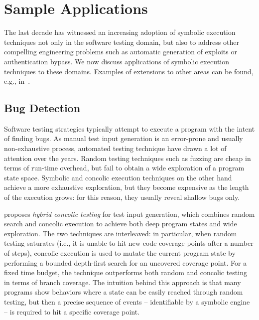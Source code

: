 
\section{Sample Applications}
\label{se:applications}

The last decade has witnessed an increasing adoption of symbolic execution techniques not only in the software testing domain, but also to address other compelling engineering problems such as automatic generation of exploits or authentication bypass. We now discuss  applications of symbolic execution techniques to these domains. Examples of extensions to other areas can be found, e.g., in~\cite{CGK-ICSE11}.

\subsection{Bug Detection}
\label{ss:bug-detection}

Software testing strategies typically attempt to execute a program with the intent of finding bugs. As manual test input generation is an error-prone and usually non-exhaustive process, automated testing technique have drawn a lot of attention over the years. Random testing techniques such as fuzzing are cheap in terms of run-time overhead, but fail to obtain a wide exploration of a program state space. Symbolic and concolic execution techniques on the other hand achieve a more exhaustive exploration, but they become expensive as the length of the execution grows: for this reason, they usually reveal shallow bugs only.

\cite{RK-ICSE07} proposes {\em hybrid concolic testing} for test input generation, which combines random search and concolic execution to achieve both deep program states and wide exploration. The two techniques are interleaved: in particular, when random testing saturates (i.e., it is unable to hit new code coverage points after a number of steps), concolic execution is used to mutate the current program state by performing a bounded depth-first search for an uncovered coverage point. For a fixed time budget, the technique outperforms both random and concolic testing in terms of branch coverage. The intuition behind this approach is that many programs show behaviors where a state can be easily reached through random testing, but then a precise sequence of events -- identifiable by a symbolic engine -- is required to hit a specific coverage point.

